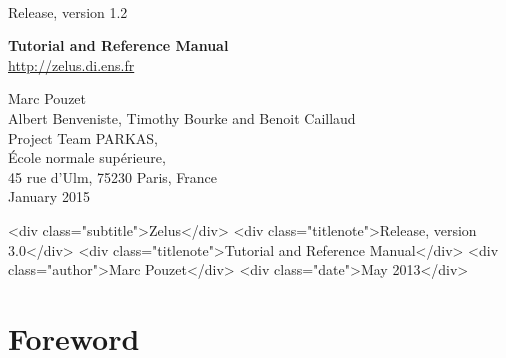 \documentclass[11pt,titlepage,twoside]{report}
\begin{document}
\pagestyle{empty}

\begin{latexonly}
\vfill

\\[2ex]
{\Large Release, version 1.2}


\vspace{7cm}

\begin{center}
{\Huge \bf Tutorial and Reference Manual} \\

\vspace{1cm}
{\Large \url{http://zelus.di.ens.fr}}
\vspace{1.5cm}

{\Large Marc Pouzet} \\[2ex]
{\Large Albert Benveniste, Timothy Bourke and Benoit Caillaud} \\[4ex]
{\large Project Team PARKAS, \\
\'Ecole normale sup\'erieure, \\ 45 rue d'Ulm,
75230 Paris, France} \\[2ex]
{\Large January 2015} \\

\end{center}
\end{latexonly}
\begin{rawhtml}
  <div class="subtitle">Zelus</div>
  <div class="titlenote">Release, version 3.0</div>
  <div class="titlenote">Tutorial and Reference Manual</div>
  <div class="author">Marc Pouzet</div>
  <div class="date">May 2013</div>
\end{rawhtml}


\newpage
\cleardoublepage
\tableofcontents
\cleardoublepage

\newcommand{\Left}{\mathit{left}}
\newcommand{\Right}{\mathit{right}}

\chapter*{Foreword}
\end{document}
